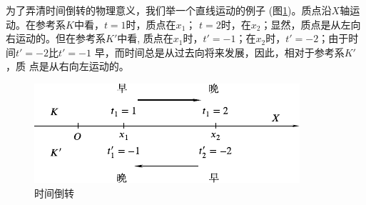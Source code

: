 为了弄清时间倒转的物理意义，我们举一个直线运动的例子
(图\ref{fig:02.05})。质点沿$X$轴运动。在参考系$K$中看，$t=1$时，质点在$x_1$；
$t=2$时，在$x_2$；显然，质点是从左向右运动的。但在参考系$K'$中看,
质点在$x_1$时，$t'=-1$；在$x_2$时，$t'=-2$；由于时间$t'=-2$比$t'=-1$
早，而时间总是从过去向将来发展，因此，相对于参考系$K'$，质
点是从右向左运动的。
\begin{figure}[h]
  \centering
  \includegraphics{figure/fig02.05}
  \caption{时间倒转}
  \label{fig:02.05}
\end{figure}
